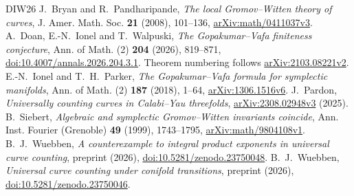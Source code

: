 \begin{thebibliography}{DIW26}
 J.~Bryan and R.~Pandharipande,
\emph{The local Gromov--Witten theory of curves},
J. Amer. Math. Soc. \textbf{21} (2008), 101--136,
\href{https://arxiv.org/abs/math/0411037v3}{arXiv:math/0411037v3}.
 A.~Doan, E.-N.~Ionel and T.~Walpuski,
\emph{The Gopakumar--Vafa finiteness conjecture},
Ann. of Math. (2) \textbf{204} (2026), 819--871,
\href{https://doi.org/10.4007/annals.2026.204.3.1}{doi:10.4007/annals.2026.204.3.1}.
Theorem numbering follows \href{https://arxiv.org/abs/2103.08221v2}{arXiv:2103.08221v2}.
 E.-N.~Ionel and T.~H.~Parker,
\emph{The Gopakumar--Vafa formula for symplectic manifolds},
Ann. of Math. (2) \textbf{187} (2018), 1--64,
\href{https://arxiv.org/abs/1306.1516v6}{arXiv:1306.1516v6}.
 J.~Pardon,
\emph{Universally counting curves in Calabi--Yau threefolds},
\href{https://arxiv.org/abs/2308.02948v3}{arXiv:2308.02948v3} (2025).
 B.~Siebert,
\emph{Algebraic and symplectic Gromov--Witten invariants coincide},
Ann. Inst. Fourier (Grenoble) \textbf{49} (1999), 1743--1795,
\href{https://arxiv.org/abs/math/9804108v1}{arXiv:math/9804108v1}.
 B.~J.~Wuebben,
\emph{A counterexample to integral product exponents in universal curve counting},
preprint (2026), \href{https://doi.org/10.5281/zenodo.23750048}{doi:10.5281/\allowbreak zenodo.23750048}.
 B.~J.~Wuebben,
\emph{Universal curve counting under conifold transitions},
preprint (2026), \href{https://doi.org/10.5281/zenodo.23750046}{doi:10.5281/\allowbreak zenodo.23750046}.
\end{thebibliography}
